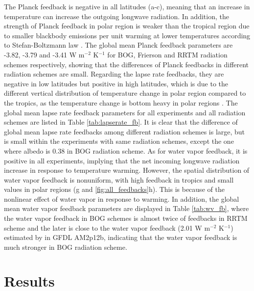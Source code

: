 The Planck feedback  is negative in all latitudes (a-c), meaning that an increase in temperature can increase the outgoing longwave radiation. In addition, the strength of Planck feedback in polar region is weaker than the tropical region due to smaller blackbody emissions per unit warming at lower temperatures according to Stefan-Boltzmann law \citep{Goosse2018}. The global mean Planck feedback parameters are -3.82, -3.79 and -3.41 W m$^{-2}$ K$^{-1}$ for BOG, Frierson and RRTM radiation schemes respectively, showing that the differences of Planck feedbacks in different radiation schemes are small. Regarding the lapse rate feedbacks, they are negative in low latitudes but positive in high latitudes, which is due to the different vertical distribution of temperature change in polar region compared to the tropics, as the temperature change is bottom heavy in polar regions \citep{Pithan2014}. The global mean lapse rate feedback parameters for all experiments and all radiation schemes are listed in Table \ref{tab:lapserate_fb}. It is clear that the difference of global mean lapse rate feedbacks among different radiation schemes is large, but is small within the experiments with same radiation schemes, except the one where albedo is 0.38 in BOG radiation scheme. As for water vapor feedback, it is positive in all experiments, implying that the net incoming longwave radiation increase in response to temperature warming. However, the spatial distribution of water vapor feedback is nonuniform, with high feedback in tropics and small values in polar regions (g and \ref{fig:all_feedbacks}h). This is because of the nonlinear effect of water vapor in response to warming.  In addition, the global mean water vapor feedback parameters are displayed in Table \ref{tab:wv_fb}, where the water vapor feedback in BOG schemes is almost twice of feedbacks in RRTM scheme and the later is close to the water vapor feedback (2.01 W m$^{-2}$ K$^{-1}$) estimated by \cite{Soden2008} in GFDL AM2p12b, indicating that the water vapor feedback is much stronger in BOG radiation scheme.



\section{Results}
\label{sec:results}

